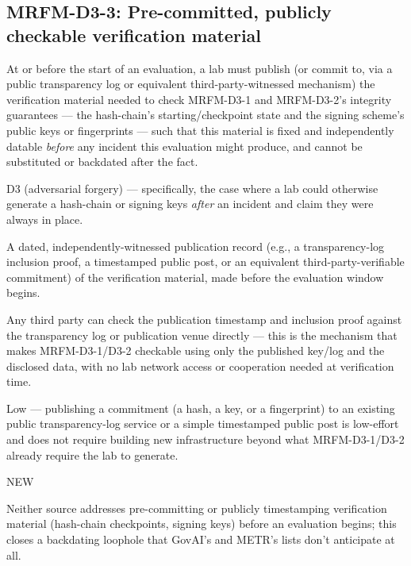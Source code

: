 \subsection*{MRFM-D3-3: Pre-committed, publicly checkable verification material}
\begin{description}[leftmargin=2.2cm, style=nextline]
\item[Requirement] At or before the start of an evaluation, a lab must publish (or commit to, via a public transparency log or equivalent third-party-witnessed mechanism) the verification material needed to check MRFM-D3-1 and MRFM-D3-2's integrity guarantees --- the hash-chain's starting/checkpoint state and the signing scheme's public keys or fingerprints --- such that this material is fixed and independently datable \emph{before} any incident this evaluation might produce, and cannot be substituted or backdated after the fact.
\item[Degradation defended] D3 (adversarial forgery) --- specifically, the case where a lab could otherwise generate a hash-chain or signing keys \emph{after} an incident and claim they were always in place.
\item[Evidence required] A dated, independently-witnessed publication record (e.g., a transparency-log inclusion proof, a timestamped public post, or an equivalent third-party-verifiable commitment) of the verification material, made before the evaluation window begins.
\item[Verifier (no lab network access needed)] Any third party can check the publication timestamp and inclusion proof against the transparency log or publication venue directly --- this is the mechanism that makes MRFM-D3-1/D3-2 checkable using only the published key/log and the disclosed data, with no lab network access or cooperation needed at verification time.
\item[Cost band] Low --- publishing a commitment (a hash, a key, or a fingerprint) to an existing public transparency-log service or a simple timestamped public post is low-effort and does not require building new infrastructure beyond what MRFM-D3-1/D3-2 already require the lab to generate.
\item[vs. prior art] NEW
\item[Prior-art note] Neither source addresses pre-committing or publicly timestamping verification material (hash-chain checkpoints, signing keys) before an evaluation begins; this closes a backdating loophole that GovAI's and METR's lists don't anticipate at all.
\end{description}

